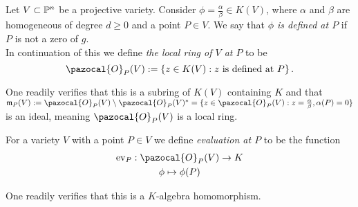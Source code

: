     \begin{definition}
        Let $V\subset \mathbb{P}^n$ be a projective variety. Consider $\phi=\frac{\alpha}{\beta}\in K(V)$, where $\alpha$ and $\beta$ are homogeneous of degree $d\geq 0$ and a point $P\in V$. We say that \textit{$\phi$ is defined at $P$} if $P$ is not a zero of $g$.\\
        In continuation of this we define \textit{the local ring of $V$ at $P$} to be
        $$\pazocal{O}_P(V):= \left\{ z\in K(V) : z \text{ is defined at }P\right\}.$$
    \end{definition}
    \begin{remark}
        One readily verifies that this is a subring of $K(V)$ containing $K$ and that $\mathfrak{m}_P(V):= \pazocal{O}_P(V)\setminus \pazocal{O}_P(V)^\ast=\{ z\in \pazocal{O}_P(V) : z=\frac{\alpha}{\beta}, \alpha(P)=0\}$ is an ideal, meaning $\pazocal{O}_P(V)$ is a local ring. 
    \end{remark}
    \begin{definition}
        For a variety $V$ with a point $P\in V$ we define \textit{evaluation at $P$} to be the function 
        \begin{gather*} 
            \ev_P : \pazocal{O}_P(V)\rightarrow K\\
            \phi \mapsto \phi(P)
        \end{gather*}
    \end{definition}
    \begin{remark}
        One readily verifies that this is a $K$-algebra homomorphism. 
    \end{remark}

